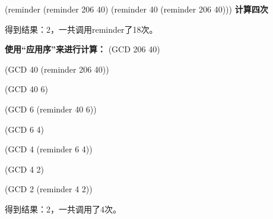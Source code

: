 \documentclass{article}
\begin{document}
\begin{CJK}{UTF8}{gkai}
(reminder (reminder 206 40) (reminder 40 (reminder 206 40))) \textbf{计算四次}

得到结果：2，一共调用reminder了18次。


\textbf{使用“应用序”来进行计算：}
(GCD 206 40)

(GCD 40 (reminder 206 40))

(GCD 40 6)

(GCD 6 (reminder 40 6))

(GCD 6 4)

(GCD 4 (reminder 6 4))

(GCD 4 2)

(GCD 2 (reminder 4 2))

得到结果：2，一共调用了4次。
\end{CJK}
\end{document}
